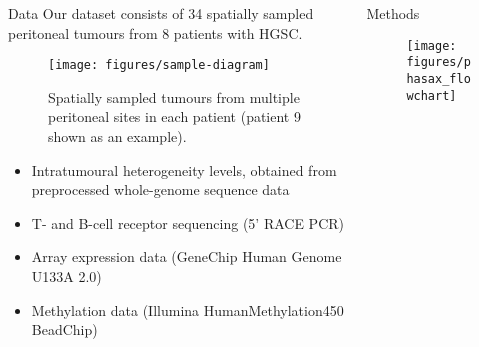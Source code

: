 \documentclass[serif,mathserif,final,dvipsnames]{beamer}
\begin{document}
\begin{frame}{}
\begin{columns}[t]
\begin{column}{0.32\linewidth}

     \begin{myblock}{Data}
      Our dataset consists of 34 spatially sampled peritoneal tumours from 8 patients with HGSC. 
      \begin{figure}
      \centering
      \texttt{[image: figures/sample-diagram]} 
      \caption{Spatially sampled tumours from multiple peritoneal sites in each patient (patient 9 shown as an example).}\label{fig:2}
      \end{figure}
        \begin{itemize}
	\item Intratumoural heterogeneity levels, obtained from preprocessed whole-genome sequence data
	\item T- and B-cell receptor sequencing (5' RACE PCR)
	\item Array expression data (GeneChip Human Genome U133A 2.0)
 	\item Methylation data (Illumina HumanMethylation450 BeadChip)
        \end{itemize}
      \end{myblock}

    \end{column}%

    \begin{column}{0.32\linewidth}

      

      \begin{myblock}{Methods}
        \begin{figure}
      \centering
      \texttt{[image: figures/phasax\_flowchart]} 
      \end{figure}
      \end{myblock}


\end{column}
\end{columns}
\end{frame}
\end{document}
